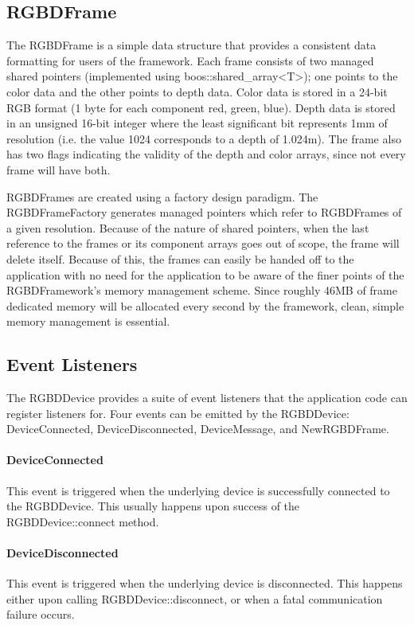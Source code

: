 \subsection{RGBDFrame}
The RGBDFrame is a simple data structure that provides a consistent data formatting for users of the framework. Each frame consists of two managed shared pointers (implemented using boos::shared\_array<T>); one points to the color data and the other points to depth data. Color data is stored in a 24-bit RGB format (1 byte for each component red, green, blue). Depth data is stored in an unsigned 16-bit integer where the least significant bit represents 1mm of resolution (i.e. the value 1024 corresponds to a depth of 1.024m). The frame also has two flags indicating the validity of the depth and color arrays, since not every frame will have both.\par
RGBDFrames are created using a factory design paradigm. The RGBDFrameFactory generates managed pointers which refer to RGBDFrames of a given resolution. Because of the nature of shared pointers, when the last reference to the frames or its component arrays goes out of scope, the frame will delete itself. Because of this, the frames can easily be handed off to the application with no need for the application to be aware of the finer points of the RGBDFramework's memory management scheme. Since roughly 46MB of frame dedicated memory will be allocated every second by the framework, clean, simple memory management is essential.
\subsection{Event Listeners}
The RGBDDevice provides a suite of event listeners that the application code can register listeners for. Four events can be emitted by the RGBDDevice: DeviceConnected, DeviceDisconnected, DeviceMessage, and NewRGBDFrame.
\paragraph{DeviceConnected}
This event is triggered when the underlying device is successfully connected to the RGBDDevice. This usually happens upon success of the RGBDDevice::connect method.
\paragraph{DeviceDisconnected}
This event is triggered when the underlying device is disconnected. This happens either upon calling RGBDDevice::disconnect, or when a fatal communication failure occurs.
